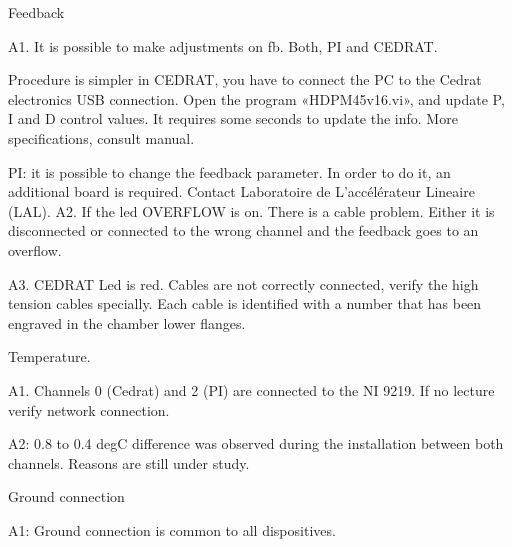 Feedback\par 
A1. It is possible to make adjustments on fb. Both, PI and CEDRAT. \par 
Procedure is simpler in CEDRAT, you have to connect the PC to the Cedrat electronics USB connection. Open the program «HDPM45v16.vi», and update P, I and D control values. It requires some seconds to update the info. More specifications, consult manual.\par 
PI: it is possible to change the feedback parameter. In order to do it, an additional board is required. Contact Laboratoire de L'accélérateur Lineaire (LAL).
A2. If the led OVERFLOW is on. There is a cable problem. Either it is disconnected or connected to the wrong channel and the feedback goes to an overflow.\par 
A3. CEDRAT Led is red. Cables are not correctly connected, verify the high tension cables specially. Each cable is identified with a number that has been engraved in the chamber lower flanges.\par 

Temperature.\par 
A1. Channels 0 (Cedrat) and 2 (PI) are connected to the NI 9219. If no lecture verify network connection.\par 
A2: 0.8 to 0.4 degC difference was observed during the installation between both channels. Reasons are still under study.\par 

Ground connection\par 
A1: Ground connection is common to all dispositives. \par 





